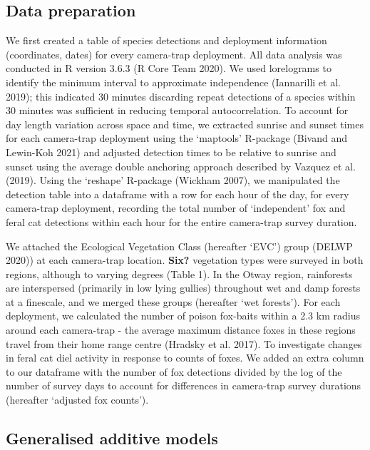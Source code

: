 \documentclass[]{elsarticle} %
\begin{document}
\hypertarget{data-preparation}{%
\subsection{Data preparation}\label{data-preparation}}

We first created a table of species detections and deployment information (coordinates, dates) for every camera-trap deployment. All data analysis was conducted in R version 3.6.3 (R Core Team 2020). We used lorelograms to identify the minimum interval to approximate independence (Iannarilli et al. 2019); this indicated 30 minutes discarding repeat detections of a species within 30 minutes was sufficient in reducing temporal autocorrelation. To account for day length variation across space and time, we extracted sunrise and sunset times for each camera-trap deployment using the `maptools' R-package (Bivand and Lewin-Koh 2021) and adjusted detection times to be relative to sunrise and sunset using the average double anchoring approach described by Vazquez et al. (2019). Using the `reshape' R-package (Wickham 2007), we manipulated the detection table into a dataframe with a row for each hour of the day, for every camera-trap deployment, recording the total number of `independent' fox and feral cat detections within each hour for the entire camera-trap survey duration.

We attached the Ecological Vegetation Class (hereafter `EVC') group (DELWP 2020)) at each camera-trap location. \textbf{Six?} vegetation types were surveyed in both regions, although to varying degrees (Table 1). In the Otway region, rainforests are interspersed (primarily in low lying gullies) throughout wet and damp forests at a finescale, and we merged these groups (hereafter `wet forests'). For each deployment, we calculated the number of poison fox-baits within a 2.3 km radius around each camera-trap - the average maximum distance foxes in these regions travel from their home range centre (Hradsky et al. 2017). To investigate changes in feral cat diel activity in response to counts of foxes. We added an extra column to our dataframe with the number of fox detections divided by the log of the number of survey days to account for differences in camera-trap survey durations (hereafter `adjusted fox counts').

\hypertarget{generalised-additive-models}{%
\subsection{Generalised additive models}\label{generalised-additive-models}}
\end{document}
